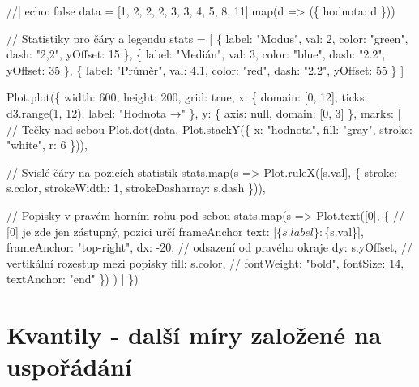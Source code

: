 \documentclass[
  czech,
  11pt,
  letterpaper,
  DIV=11,
  numbers=noendperiod]{scrreprt}
\newenvironment{Shaded}{\begin{snugshade}}{\end{snugshade}}
\newcommand{\NormalTok}[1]{\textcolor[rgb]{0.00,0.23,0.31}{#1}}
\begin{document}
\begin{Shaded}
\begin{Highlighting}[]
\NormalTok{//| echo: false}
\NormalTok{data = [1, 2, 2, 2, 3, 3, 4, 5, 8, 11].map(d =\textgreater{} (\{ hodnota: d \}))}

\NormalTok{// Statistiky pro čáry a legendu}
\NormalTok{stats = [}
\NormalTok{  \{ label: "Modus", val: 2, color: "green", dash: "2,2", yOffset: 15 \},}
\NormalTok{  \{ label: "Medián", val: 3, color: "blue", dash: "2.2", yOffset: 35 \},}
\NormalTok{  \{ label: "Průměr", val: 4.1, color: "red", dash: "2.2", yOffset: 55 \}}
\NormalTok{]}

\NormalTok{Plot.plot(\{}
\NormalTok{  width: 600,}
\NormalTok{  height: 200,}
\NormalTok{  grid: true,}
\NormalTok{  x: \{  domain: [0, 12], }
\NormalTok{        ticks: d3.range(1, 12), }
\NormalTok{        label: "Hodnota →" \},}
\NormalTok{  y: \{  axis: null, }
\NormalTok{        domain: [0, 3] \}, }
\NormalTok{  marks: [}
\NormalTok{    // Tečky nad sebou}
\NormalTok{    Plot.dot(data, Plot.stackY(\{ x: "hodnota", fill: "gray", stroke: "white", r: 6 \})),}

\NormalTok{    // Svislé čáry na pozicích statistik}
\NormalTok{    stats.map(s =\textgreater{} Plot.ruleX([s.val], \{ stroke: s.color, strokeWidth: 1, strokeDasharray: s.dash \})),}

\NormalTok{    // Popisky v pravém horním rohu pod sebou}
\NormalTok{    stats.map(s =\textgreater{} }
\NormalTok{      Plot.text([0], \{ // [0] je zde jen zástupný, pozici určí frameAnchor}
\NormalTok{        text: [\textasciigrave{}$\{s.label\}: $\{s.val\}\textasciigrave{}],}
\NormalTok{        frameAnchor: "top{-}right",}
\NormalTok{        dx: {-}20,        // odsazení od pravého okraje}
\NormalTok{        dy: s.yOffset,  // vertikální rozestup mezi popisky}
\NormalTok{        fill: s.color,}
\NormalTok{        // fontWeight: "bold",}
\NormalTok{        fontSize: 14,}
\NormalTok{        textAnchor: "end"}
\NormalTok{      \})}
\NormalTok{    )}
\NormalTok{  ]}
\NormalTok{\})}
\end{Highlighting}
\end{Shaded}

\section*{Kvantily - další míry založené na
uspořádání}\label{kvantily---dalux161uxed-muxedry-zaloux17eenuxe9-na-uspoux159uxe1duxe1nuxed}

\end{document}
